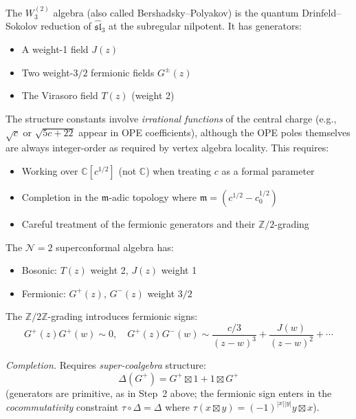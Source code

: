 \begin{example}
\label{ex:bp-algebra}

The $W_3^{(2)}$ algebra (also called Bershadsky--Polyakov) is the quantum Drinfeld--Sokolov reduction of $\widehat{\mathfrak{sl}}_3$ at the subregular nilpotent. It has generators:
\begin{itemize}
\item A weight-1 field $J(z)$
\item Two weight-$3/2$ fermionic fields $G^{\pm}(z)$
\item The Virasoro field $T(z)$ (weight 2)
\end{itemize}

The structure constants involve \emph{irrational functions} of the central charge (e.g., $\sqrt{c}$ or $\sqrt{5c+22}$ appear in OPE coefficients), although the OPE poles themselves are always integer-order as required by vertex algebra locality. This requires:
\begin{itemize}
\item Working over $\mathbb{C}[c^{1/2}]$ (not $\mathbb{C}$) when treating $c$ as a formal parameter
\item Completion in the $\mathfrak{m}$-adic topology where $\mathfrak{m} = (c^{1/2} - c_0^{1/2})$
\item Careful treatment of the fermionic generators and their $\mathbb{Z}/2$-grading
\end{itemize}
\end{example}

\begin{example}
\label{ex:n2-superconformal}

The $\mathcal{N}=2$ superconformal algebra has:
\begin{itemize}
\item Bosonic: $T(z)$ weight 2, $J(z)$ weight 1
\item Fermionic: $G^+(z)$, $G^-(z)$ weight $3/2$
\end{itemize}

The $\mathbb{Z}/2\mathbb{Z}$-grading introduces fermionic signs:
\[G^+(z)G^+(w) \sim 0, \quad G^+(z)G^-(w) \sim \frac{c/3}{(z-w)^3} + \frac{J(w)}{(z-w)^2} + \cdots\]

\emph{Completion.} Requires \emph{super-coalgebra} structure:
\[\Delta(G^+) = G^+ \boxtimes 1 + 1 \boxtimes G^+\]
(generators are primitive, as in Step~2 above; the fermionic sign enters in the \emph{cocommutativity} constraint $\tau \circ \Delta = \Delta$ where $\tau(x \boxtimes y) = (-1)^{|x||y|} y \boxtimes x$).
\end{example}

